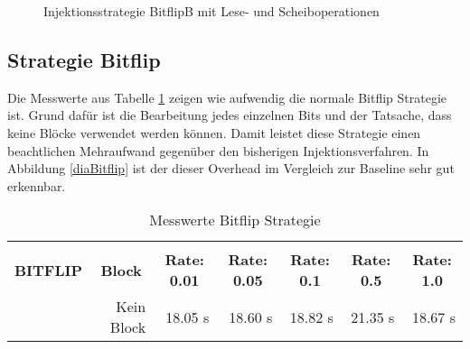 \begin{figure}[!htb]

\caption[Messung BitflipB Strategie]{Injektionsstrategie BitflipB mit Lese- und Scheiboperationen}
\label{diaBitflipB}
\end{figure}

\subsection*{Strategie Bitflip}
Die Messwerte aus Tabelle \ref{tblBitflip} zeigen wie aufwendig die normale Bitflip Strategie ist. Grund dafür ist die Bearbeitung jedes einzelnen Bits und der Tatsache, dass keine Bl\"ocke verwendet werden können. Damit leistet diese Strategie einen beachtlichen Mehraufwand gegen\"uber den bisherigen Injektionsverfahren. In Abbildung \ref{diaBitflip} ist der dieser Overhead im Vergleich zur Baseline sehr gut erkennbar.

\begin{table}[!htb]

\begin{tabular}{rrrrrrr}
\hline\\
\multicolumn{0}{c}{\colorbox{myblue}{\textbf{BITFLIP}}} &  
\multicolumn{0}{c}{\colorbox{myblue}{\textbf{Block}}} &  
\multicolumn{0}{c}{\colorbox{myblue}{\textbf{Rate: 0.01}}} &  
\multicolumn{0}{c}{\colorbox{myblue}{\textbf{Rate: 0.05}}} & 
\multicolumn{0}{c}{\colorbox{myblue}{\textbf{Rate: 0.1}}} &
\multicolumn{0}{c}{\colorbox{myblue}{\textbf{Rate: 0.5}}} & 
\multicolumn{0}{c}{\colorbox{myblue}{\textbf{Rate: 1.0}}}\\
 & Kein Block & 18.05 s & 18.60 s & 18.82 s & 21.35 s & 18.67 s \\
\hline
\end{tabular}
\caption{Messwerte Bitflip Strategie}
\label{tblBitflip}
\end{table}

